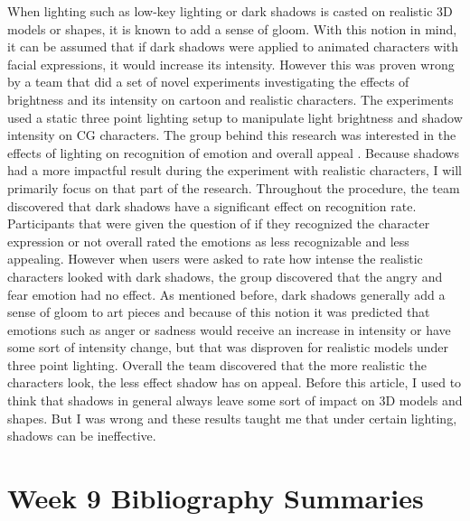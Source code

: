\documentclass{article}
\begin{document}
When lighting such as low-key lighting or dark shadows is casted on realistic 3D models or shapes, it is known to add a sense of gloom. With this notion in mind, it can be assumed that if dark shadows were applied to animated characters with facial expressions, it would increase its intensity. However this was proven wrong by a team that did a set of novel experiments investigating the effects of brightness and its intensity on cartoon and realistic characters. The experiments used a static three point lighting setup to manipulate light brightness and shadow intensity on CG characters. The group behind this research was interested in the effects of lighting on recognition of emotion and overall appeal \cite{10.1145/3383195}. Because shadows had a more impactful result during the experiment with realistic characters, I will primarily focus on that part of the research. Throughout the procedure, the team discovered that dark shadows have a significant effect on recognition rate. Participants that were given the question of if they recognized the character expression or not overall rated the emotions as less recognizable and less appealing. However when users were asked to rate how intense the realistic characters looked with dark shadows, the group discovered that the angry and fear emotion had no effect. As mentioned before, dark shadows generally add a sense of gloom to art pieces and because of this notion it was predicted that emotions such as anger or sadness would receive an increase in intensity or have some sort of intensity change, but that was disproven for realistic models under three point lighting. Overall the team discovered that the more realistic the characters look, the less effect shadow has on appeal. Before this article, I used to think that shadows in general always leave some sort of impact on 3D models and shapes. But I was wrong and these results taught me that under certain lighting, shadows can be ineffective.

\section{Week 9 Bibliography Summaries}
\end{document}

